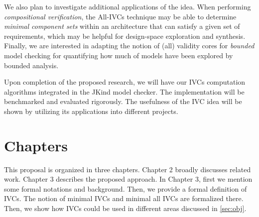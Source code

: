 We also plan to investigate additional applications of the idea.  When performing {\em compositional verification}, the All-IVCs technique may be able to determine {\em minimal component sets} within an architecture that can satisfy a given set of requirements, which may be helpful for design-space exploration and synthesis. Finally, we are interested in adapting the notion of (all) validity cores for \emph{bounded} model checking for quantifying how much of models have been explored by bounded analysis.

Upon completion of the proposed research, we will have our IVCs computation algorithms integrated in the JKind model checker. The implementation will be benchmarked and evaluated rigorously. The usefulness of the IVC idea will be shown by utilizing its applications into different projects.


\section{Chapters}
This proposal is organized in three chapters. Chapter 2 broadly discusses related work. Chapter 3 describes the proposed approach. In Chapter 3, first we mention some formal notations and background. Then, we provide a formal definition of IVCs. The notion of minimal IVCs and minimal all IVCs are formalized there. Then, we show how IVCs could be used in different areas discussed in \ref{sec:obj}.




